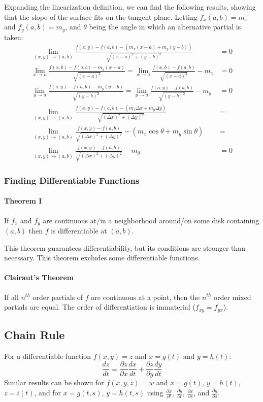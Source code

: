\documentclass{article}
\begin{document}
Expanding the linearization definition, we can find the following results, showing that the slope of the surface fits on the tangent plane. Letting $f_x(a,b) = m_x$ and $f_y(a,b) = m_y$, and $\theta$ being the angle in which an alternative partial is taken:
\begin{align*}
	\lim_{(x,y)\to(a,b)} \frac{f(x,y) - f(a,b) - (m_x(x - a) + m_y(y - b))}{\sqrt{(x-a)^2+(y-b)^2}} &= 0\\
	\lim_{x\to a} \frac{f(x,b) - f(a,b) - m_x(x - a)}{\sqrt{(x-a)^2}} =
	 \lim_{x\to a} \frac{f(x,b) - f(a,b)}{\sqrt{(x-a)^2}} - m_x &= 0\\
	\lim_{y\to a} \frac{f(a,y) - f(a,b) - m_y(y - b)}{\sqrt{(y-b)^2}} =
	 \lim_{y\to a} \frac{f(a,y) - f(a,b)}{\sqrt{(y-b)^2}} - m_y &= 0\\
	\lim_{(x,y)\to(a,b)} \frac{f(x,y) - f(a,b) - (m_x\Delta{x} + m_y\Delta{y})}{\sqrt{(\Delta{x})^2+(\Delta{y})^2}} &=\\
	 \lim_{(x,y)\to(a,b)} \frac{f(x,y) - f(a,b)}{\sqrt{(\Delta{x})^2+(\Delta{y})^2}} - (m_x\cos{\theta} + m_y\sin{\theta}) &=\\
	 \lim_{(x,y)\to(a,b)} \frac{f(x,y) - f(a,b)}{\sqrt{(\Delta{x})^2+(\Delta{y})^2}} - m_\theta &= 0
\end{align*}


\subsubsection{Finding Differentiable Functions}
\paragraph{Theorem I} If $f_x$ and $f_y$ are continuous at/in a neighborhood around/on some disk containing $(a,b)$ then $f$ is differentiable at $(a,b)$.

This theorem guarantees differentiability, but its conditions are stronger than necessary. This theorem excludes some differentiable functions.

\paragraph{Clairaut's Theorem} If all $n^{th}$ order partials of $f$ are continuous at a point, then the $n^{th}$ order mixed partials are equal. The order of differentiation is immaterial ($f_{xy}=f_{yx}$).

\subsection{Chain Rule}
For a differentiable function $f(x,y)=z$ and $x=g(t)$ and $y=h(t)$:
$$\frac{dz}{dt}=\frac{\partial z}{\partial x}\frac{dx}{dt}+\frac{\partial z}{\partial y}\frac{dy}{dt}$$
Similar results can be shown for $f(x,y,z)=w$ and $x=g(t)$, $y=h(t)$, $z=i(t)$, and for $x=g(t,s)$, $y=h(t,s)$ using $\frac{\partial{x}}{\partial{t}}$, $\frac{\partial{y}}{\partial{t}}$, $\frac{\partial{x}}{\partial{s}}$, and $\frac{\partial{y}}{\partial{s}}$.
\end{document}
